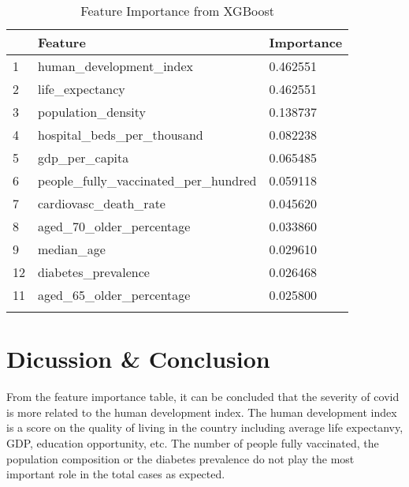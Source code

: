 \documentclass[10pt, a4paper, twocolumn]{article} %
\begin{document}
\begin{table}
	\caption{Feature Importance from XGBoost}
	\centering
	\begin{tabular}{lll}
		\toprule
		& \textbf{Feature} & \textbf{Importance} \\
		\midrule
		1& human\_development\_index & 0.462551 \\
		2& life\_expectancy& 0.462551\\
		3& population\_density& 0.138737\\
		4& hospital\_beds\_per\_thousand& 0.082238\\
		5& gdp\_per\_capita& 0.065485\\
		6& people\_fully\_vaccinated\_per\_hundred& 0.059118\\
		7& cardiovasc\_death\_rate& 0.045620\\
		8& aged\_70\_older\_percentage& 0.033860\\
		9& median\_age& 0.029610\\
		12& diabetes\_prevalence& 0.026468\\
		11& aged\_65\_older\_percentage& 0.025800\\
		\bottomrule
	\label{tab:feature_importance}
	\end{tabular}
\end{table}
\section{Dicussion \& Conclusion}\label{sec:discussion}
From the feature importance table, it can be concluded that the severity of covid is more related 
to the human development index. The human development index is a score on the quality of living in the 
country including average life expectanvy, GDP, education opportunity, etc. The number of people fully 
vaccinated, the population composition or the diabetes prevalence do not play the most important role 
in the total cases as expected.   

\printbibliography[title={Bibliography}] %

\end{document}

